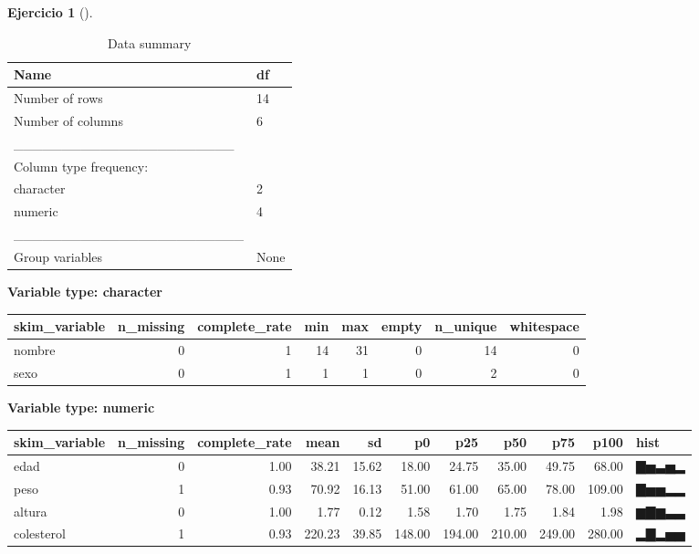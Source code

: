 \documentclass[
  a4paper,
]{scrreport}
\theoremstyle{definition}
\newtheorem{exercise}{Ejercicio}[chapter]
\theoremstyle{remark}
\begin{document}
\begin{exercise}[]
\begin{enumerate}
\begin{tcolorbox}
\begin{table}
  \caption{\label{tab:unnamed-chunk-23}Data summary}
  \centering
  \begin{tabular}[t]{l|l}
  \hline
  Name & df\\
  \hline
  Number of rows & 14\\
  \hline
  Number of columns & 6\\
  \hline
  \_\_\_\_\_\_\_\_\_\_\_\_\_\_\_\_\_\_\_\_\_\_\_ & \\
  \hline
  Column type frequency: & \\
  \hline
  character & 2\\
  \hline
  numeric & 4\\
  \hline
  \_\_\_\_\_\_\_\_\_\_\_\_\_\_\_\_\_\_\_\_\_\_\_\_ & \\
  \hline
  Group variables & None\\
  \hline
  \end{tabular}
  \end{table}

  \textbf{Variable type: character}

  \begin{tabular}{l|r|r|r|r|r|r|r}
  \hline
  skim\_variable & n\_missing & complete\_rate & min & max & empty & n\_unique & whitespace\\
  \hline
  nombre & 0 & 1 & 14 & 31 & 0 & 14 & 0\\
  \hline
  sexo & 0 & 1 & 1 & 1 & 0 & 2 & 0\\
  \hline
  \end{tabular}

  \textbf{Variable type: numeric}

  \begin{tabular}{l|r|r|r|r|r|r|r|r|r|l}
  \hline
  skim\_variable & n\_missing & complete\_rate & mean & sd & p0 & p25 & p50 & p75 & p100 & hist\\
  \hline
  edad & 0 & 1.00 & 38.21 & 15.62 & 18.00 & 24.75 & 35.00 & 49.75 & 68.00 & ▇▅▃▅▂\\
  \hline
  peso & 1 & 0.93 & 70.92 & 16.13 & 51.00 & 61.00 & 65.00 & 78.00 & 109.00 & ▇▅▅▂▂\\
  \hline
  altura & 0 & 1.00 & 1.77 & 0.12 & 1.58 & 1.70 & 1.75 & 1.84 & 1.98 & ▆▇▆▃▃\\
  \hline
  colesterol & 1 & 0.93 & 220.23 & 39.85 & 148.00 & 194.00 & 210.00 & 249.00 & 280.00 & ▂▇▂▅▅\\
  \hline
  \end{tabular}

  \end{tcolorbox}


\end{enumerate}
\end{exercise}
\end{document}
